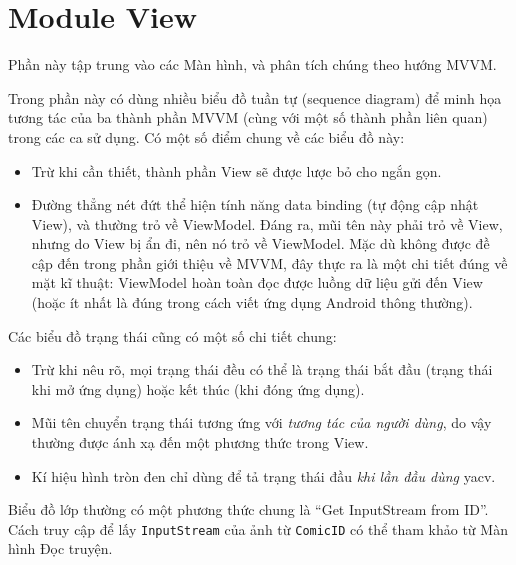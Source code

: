 \documentclass[../../../../thesis]{subfiles}
\begin{document}
\section{Module View}\label{sec:module-view}

Phần này tập trung vào các Màn hình, và phân tích chúng theo hướng MVVM.

Trong phần này có dùng nhiều biểu đồ tuần tự (sequence diagram) để minh họa
tương tác của ba thành phần MVVM (cùng với một số thành phần liên quan) trong
các ca sử dụng. Có một số điểm chung về các biểu đồ này:

\begin{itemize}
    \item
        Trừ khi cần thiết, thành phần View sẽ được lược bỏ cho ngắn gọn.
    \item
        Đường thẳng nét đứt thể hiện tính năng data binding (tự động cập nhật
        View), và thường trỏ về ViewModel. Đáng ra, mũi tên này phải trỏ về
        View, nhưng do View bị ẩn đi, nên nó trỏ về ViewModel. Mặc dù không được
        đề cập đến trong phần giới thiệu về MVVM, đây thực ra là một chi tiết
        đúng về mặt kĩ thuật: ViewModel hoàn toàn đọc được luồng dữ liệu gửi đến
        View (hoặc ít nhất là đúng trong cách viết ứng dụng Android thông
        thường).
\end{itemize}

Các biểu đồ trạng thái cũng có một số chi tiết chung:

\begin{itemize}
    \item
        Trừ khi nêu rõ, mọi trạng thái đều có thể là trạng thái bắt đầu (trạng
        thái khi mở ứng dụng) hoặc kết thúc (khi đóng ứng dụng).
    \item
        Mũi tên chuyển trạng thái tương ứng với \emph{tương tác của người dùng},
        do vậy thường được ánh xạ đến một phương thức trong View.
    \item
        Kí hiệu hình tròn đen chỉ dùng để tả trạng thái đầu \emph{khi lần đầu
        dùng} yacv.
\end{itemize}

Biểu đồ lớp thường có một phương thức chung là ``Get InputStream from ID''. Cách
truy cập để lấy \texttt{InputStream} của ảnh từ \texttt{ComicID} có thể tham
khảo từ Màn hình Đọc truyện.


\end{document}
